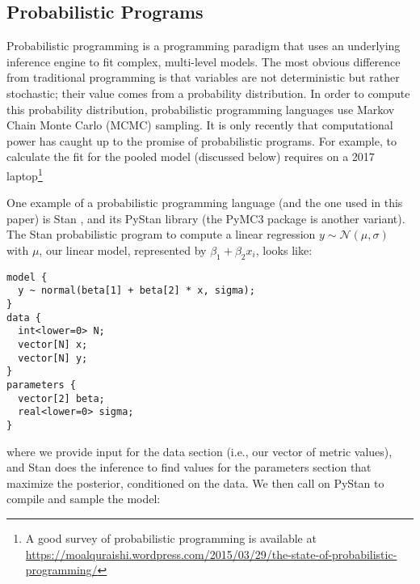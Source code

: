 \documentclass[sigconf,natbib=false]{acmart}
\begin{document}
\subsection{Probabilistic Programs} %
Probabilistic programming is a programming paradigm that uses an underlying inference engine to fit complex, multi-level models. The most obvious difference from traditional programming is that variables are not deterministic but rather stochastic; their value comes from a probability distribution. In order to compute this probability distribution, probabilistic programming languages use Markov Chain Monte Carlo (MCMC) sampling. 
It is only recently that computational power has caught up to the promise of probabilistic programs. For example, to calculate the fit for the pooled model (discussed below) requires  on a 2017 laptop\footnote{A good survey of probabilistic programming is available at \url{https://moalquraishi.wordpress.com/2015/03/29/the-state-of-probabilistic-programming/}}




One example of a probabilistic programming language (and the one used in this paper) is Stan \cite{Carpenter2017}, and its PyStan library (the PyMC3 package is another variant). The Stan probabilistic program to compute a linear regression $y \sim \mathcal{N}(\mu,\sigma)$ with $\mu$, our linear model, represented by $\beta_1 + \beta_2 x_i$, looks like:

\begin{verbatim}
model {
  y ~ normal(beta[1] + beta[2] * x, sigma);
}
data {
  int<lower=0> N; 
  vector[N] x;
  vector[N] y;
}
parameters {
  vector[2] beta;
  real<lower=0> sigma;
} 
\end{verbatim}

where we provide input for the data section (i.e., our vector of metric values), and Stan does the inference to find values for the parameters section that maximize the posterior, conditioned on the data. We then call on PyStan to compile and sample the model:
\end{document}
